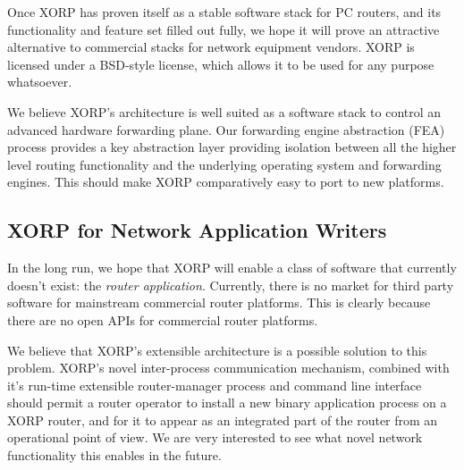 Once XORP has proven itself as a stable software stack for PC routers,
and its functionality and feature set filled out fully, we hope it
will prove an attractive alternative to commercial stacks for network
equipment vendors. XORP is licensed under a BSD-style license, which allows it to be used
for any purpose whatsoever. %

We believe XORP's architecture is well suited as a software stack to
control an advanced hardware forwarding plane.  Our forwarding engine
abstraction (FEA) process provides a key abstraction layer providing
isolation between all the higher level routing functionality and the
underlying operating system and forwarding engines.  This should make
XORP comparatively easy to port to new platforms.

\subsection{XORP for Network Application Writers}

In the long run, we hope that XORP will enable a class of software
that currently doesn't exist: the \textit{router application}.  Currently,
there is no market for third party software for mainstream commercial
router platforms.  This is clearly because there are no open APIs for
commercial router platforms.  

We believe that XORP's extensible architecture is a possible solution
to this problem.  XORP's novel inter-process communication mechanism,
combined with it's run-time extensible router-manager process and
command line interface should permit a router operator to install a
new binary application process on a XORP router, and for it to appear
as an integrated part of the router from an operational point of view.
We are very interested to see what novel network functionality this
enables in the future.
